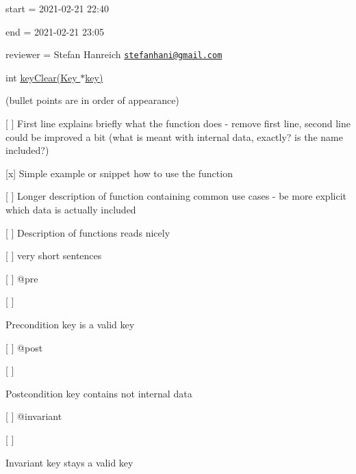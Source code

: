 
\begin{DoxyItemize}
\item start = 2021-\/02-\/21 22\+:40
\item end = 2021-\/02-\/21 23\+:05
\item reviewer = Stefan Hanreich \href{mailto:stefanhani@gmail.com}{\tt stefanhani@gmail.\+com}
\end{DoxyItemize}

{\ttfamily int \hyperlink{group__key_gab2242311a36bbc0520e0d36895107ec1}{key\+Clear(\+Key $\ast$key)}}

(bullet points are in order of appearance)


\begin{DoxyItemize}
\item \mbox{[} \mbox{]} First line explains briefly what the function does -\/ remove first line, second line could be improved a bit (what is meant with internal data, exactly? is the name included?)
\item \mbox{[}x\mbox{]} Simple example or snippet how to use the function
\item \mbox{[} \mbox{]} Longer description of function containing common use cases -\/ be more explicit which data is actually included
\item \mbox{[} \mbox{]} Description of functions reads nicely
\begin{DoxyItemize}
\item \mbox{[} \mbox{]} very short sentences
\end{DoxyItemize}
\item \mbox{[} \mbox{]} {\ttfamily @pre}
\begin{DoxyItemize}
\item \mbox{[} \mbox{]} \begin{DoxyPrecond}{Precondition}
key is a valid key
\end{DoxyPrecond}

\end{DoxyItemize}
\item \mbox{[} \mbox{]} {\ttfamily @post}
\begin{DoxyItemize}
\item \mbox{[} \mbox{]} \begin{DoxyPostcond}{Postcondition}
key contains not internal data
\end{DoxyPostcond}

\end{DoxyItemize}
\item \mbox{[} \mbox{]} {\ttfamily @invariant}
\begin{DoxyItemize}
\item \mbox{[} \mbox{]} \begin{DoxyInvariant}{Invariant}
key stays a valid key
\end{DoxyInvariant}


\end{DoxyItemize}
\end{DoxyItemize}
